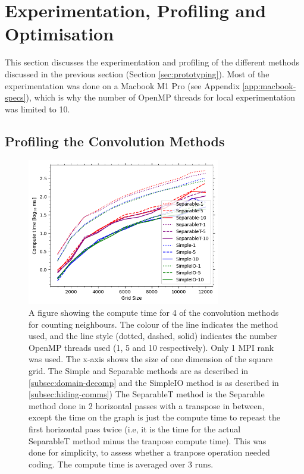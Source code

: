 
\section{Experimentation, Profiling and Optimisation}\label{sec:profiling}
    This section discusses the experimentation and profiling of the different methods discussed in the previous
    section (Section \eqref{sec:prototyping}).
    Most of the experimentation was done on a Macbook M1 Pro (see Appendix \eqref{app:macbook-specs}), which is why the number of OpenMP threads for local
    experimentation was limited to 10.
    \subsection{Profiling the Convolution Methods}\label{subsec:prof-conv}
    \begin{figure}[htb]
    \centering
    \includegraphics[width=0.75\textwidth]{./figures/convolutions}
    \caption{A figure showing the compute time for 4 of the convolution methods for counting neighbours.
        The colour of the line indicates the method used, and the line style (dotted, dashed, solid) indicates the number
        OpenMP threads used (1, 5 and 10 respectively).
        Only 1 MPI rank was used.
        The x-axis shows the size of one dimension of the square grid.
        The Simple and Separable methods are as described in \eqref{subsec:domain-decomp} and the SimpleIO method is
        as described in \eqref{subsec:hiding-comms})
        The SeparableT method is the Separable method done in 2 horizontal passes with a transpose in between, except
        the time on the graph is just the compute time to repeast the first horizontal pass twice (i.e, it is the time
        for the actual SeparableT method minus the tranpose compute time).
        This was done for simplicity, to assess whether a tranpose operation needed coding.
        The compute time is averaged over 3 runs.}
    \label{fig:convolutions}
    \end{figure}


